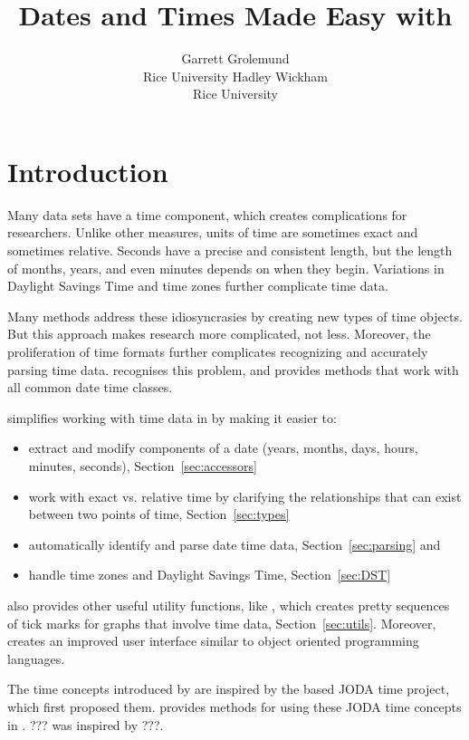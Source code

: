 \documentclass[article]{jss}
\author{Garrett Grolemund\\Rice University \And 
        Hadley Wickham\\Rice University}
\title{Dates and Times Made Easy with \pkg{lubridate}}
\begin{document}
\section{Introduction}

Many data sets have a time component, which creates complications for researchers. Unlike other measures, units of time are sometimes exact and sometimes relative.  Seconds have a precise and consistent length, but the length of months, years, and even minutes depends on when they begin. Variations in Daylight Savings Time and time zones further complicate time data.

Many  methods address these idiosyncrasies by creating new types of time objects.  But this approach makes research more complicated, not less. Moreover, the proliferation of time formats further complicates recognizing and accurately parsing time data.   recognises this problem, and provides methods that work with all common date time classes.

 simplifies working with time data in  by making it easier to:

\begin{itemize}
  \item extract and modify components of a date (years, months, days, hours, minutes, seconds), Section~\ref{sec:accessors}
  
  \item work with exact vs. relative time by clarifying the relationships that can exist between two points of time, Section~\ref{sec:types}
  
  \item automatically identify and parse date time data, Section~\ref{sec:parsing} and
  
  \item handle time zones and Daylight Savings Time, Section~\ref{sec:DST} 
  
\end{itemize}

 also provides other useful utility functions, like , which creates pretty sequences of tick marks for graphs that involve time data,  Section~\ref{sec:utils}. Moreover,  creates an improved user interface similar to object oriented programming languages.

The time concepts introduced by  are inspired by the  based JODA time project, which first proposed them.  provides methods for using these JODA time concepts in .
??? was inspired by ???.
\end{document}
